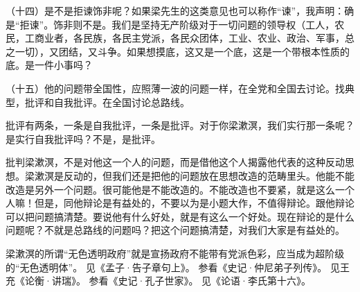 （十四）是不是拒谏饰非呢？如果梁先生的这类意见也可以称作“谏”，我声明：确是“拒谏”。饰非则不是。我们是坚持无产阶级对于一切问题的领导权（工人，农民，工商业者，各民族，各民主党派，各民众团体，工业、农业、政治、军事，总之一切），又团结，又斗争。如果想摸底，这又是一个底，这是一个带根本性质的底。是一件小事吗？

（十五）他的问题带全国性，应照薄一波的问题一样，在全党和全国去讨论。找典型，批评和自我批评。在全国讨论总路线。

批评有两条，一条是自我批评，一条是批评。对于你梁漱溟，我们实行那一条呢？是实行自我批评吗？不是，是批评。

批判梁漱溟，不是对他这一个人的问题，而是借他这个人揭露他代表的这种反动思想。梁漱溟是反动的，但我们还是把他的问题放在思想改造的范畴里头。他能不能改造是另外一个问题。很可能他是不能改造的。不能改造也不要紧，就是这么一个人嘛！但是，同他辩论是有益处的，不要以为是小题大作，不值得辩论。跟他辩论可以把问题搞清楚。要说他有什么好处，就是有这么一个好处。现在辩论的是什么问题呢？不就是总路线的问题吗？把这个问题搞清楚，对我们大家是有益处的。


\begin{maonote}
梁漱溟的所谓“无色透明政府”就是宣扬政府不能带有党派色彩，应当成为超阶级的“无色透明体”。
见《孟子·告子章句上》。
参看《史记·仲尼弟子列传》。
见王充《论衡·讲瑞》。
参看《史记·孔子世家》。
见《论语·李氏第十六》。
\end{maonote}

